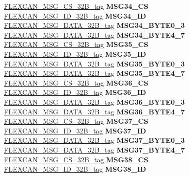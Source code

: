 \begin{DoxyCompactItemize}
\begin{tabbing}
\>\>\mbox{\hyperlink{unionFLEXCAN__MSG__CS__32B__tag}{FLEXCAN\_MSG\_CS\_32B\_tag}} {\bfseries MSG34\_CS}\\
\>\>\mbox{\hyperlink{unionFLEXCAN__MSG__ID__32B__tag}{FLEXCAN\_MSG\_ID\_32B\_tag}} {\bfseries MSG34\_ID}\\
\>\>\mbox{\hyperlink{unionFLEXCAN__MSG__DATA__32B__tag}{FLEXCAN\_MSG\_DATA\_32B\_tag}} {\bfseries MSG34\_BYTE0\_3}\\
\>\>\mbox{\hyperlink{unionFLEXCAN__MSG__DATA__32B__tag}{FLEXCAN\_MSG\_DATA\_32B\_tag}} {\bfseries MSG34\_BYTE4\_7}\\
\>\>\mbox{\hyperlink{unionFLEXCAN__MSG__CS__32B__tag}{FLEXCAN\_MSG\_CS\_32B\_tag}} {\bfseries MSG35\_CS}\\
\>\>\mbox{\hyperlink{unionFLEXCAN__MSG__ID__32B__tag}{FLEXCAN\_MSG\_ID\_32B\_tag}} {\bfseries MSG35\_ID}\\
\>\>\mbox{\hyperlink{unionFLEXCAN__MSG__DATA__32B__tag}{FLEXCAN\_MSG\_DATA\_32B\_tag}} {\bfseries MSG35\_BYTE0\_3}\\
\>\>\mbox{\hyperlink{unionFLEXCAN__MSG__DATA__32B__tag}{FLEXCAN\_MSG\_DATA\_32B\_tag}} {\bfseries MSG35\_BYTE4\_7}\\
\>\>\mbox{\hyperlink{unionFLEXCAN__MSG__CS__32B__tag}{FLEXCAN\_MSG\_CS\_32B\_tag}} {\bfseries MSG36\_CS}\\
\>\>\mbox{\hyperlink{unionFLEXCAN__MSG__ID__32B__tag}{FLEXCAN\_MSG\_ID\_32B\_tag}} {\bfseries MSG36\_ID}\\
\>\>\mbox{\hyperlink{unionFLEXCAN__MSG__DATA__32B__tag}{FLEXCAN\_MSG\_DATA\_32B\_tag}} {\bfseries MSG36\_BYTE0\_3}\\
\>\>\mbox{\hyperlink{unionFLEXCAN__MSG__DATA__32B__tag}{FLEXCAN\_MSG\_DATA\_32B\_tag}} {\bfseries MSG36\_BYTE4\_7}\\
\>\>\mbox{\hyperlink{unionFLEXCAN__MSG__CS__32B__tag}{FLEXCAN\_MSG\_CS\_32B\_tag}} {\bfseries MSG37\_CS}\\
\>\>\mbox{\hyperlink{unionFLEXCAN__MSG__ID__32B__tag}{FLEXCAN\_MSG\_ID\_32B\_tag}} {\bfseries MSG37\_ID}\\
\>\>\mbox{\hyperlink{unionFLEXCAN__MSG__DATA__32B__tag}{FLEXCAN\_MSG\_DATA\_32B\_tag}} {\bfseries MSG37\_BYTE0\_3}\\
\>\>\mbox{\hyperlink{unionFLEXCAN__MSG__DATA__32B__tag}{FLEXCAN\_MSG\_DATA\_32B\_tag}} {\bfseries MSG37\_BYTE4\_7}\\
\>\>\mbox{\hyperlink{unionFLEXCAN__MSG__CS__32B__tag}{FLEXCAN\_MSG\_CS\_32B\_tag}} {\bfseries MSG38\_CS}\\
\>\>\mbox{\hyperlink{unionFLEXCAN__MSG__ID__32B__tag}{FLEXCAN\_MSG\_ID\_32B\_tag}} {\bfseries MSG38\_ID}\\

\end{tabbing}
\end{DoxyCompactItemize}
